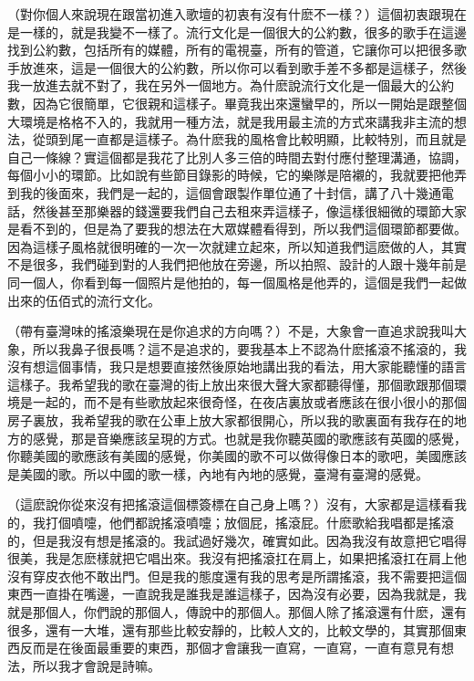 \documentclass[UTF8,a4paper,oneside,twocolumn,12pt]{ctexbook}
\begin{document}
（對你個人來說現在跟當初進入歌壇的初衷有沒有什麽不一樣？）這個初衷跟現在是一樣的，就是我變不一樣了。流行文化是一個很大的公約數，很多的歌手在這邊找到公約數，包括所有的媒體，所有的電視臺，所有的管道，它讓你可以把很多歌手放進來，這是一個很大的公約數，所以你可以看到歌手差不多都是這樣子，然後我一放進去就不對了，我在另外一個地方。為什麽說流行文化是一個最大的公約數，因為它很簡單，它很親和這樣子。畢竟我出來還蠻早的，所以一開始是跟整個大環境是格格不入的，我就用一種方法，就是我用最主流的方式來講我非主流的想法，從頭到尾一直都是這樣子。為什麽我的風格會比較明顯，比較特別，而且就是自己一條線？實這個都是我花了比別人多三倍的時間去對付應付整理溝通，協調，每個小小的環節。比如說有些節目錄影的時候，它的樂隊是陪襯的，我就要把他弄到我的後面來，我們是一起的，這個會跟製作單位通了十封信，講了八十幾通電話，然後甚至那樂器的錢還要我們自己去租來弄這樣子，像這樣很細微的環節大家是看不到的，但是為了要我的想法在大眾媒體看得到，所以我們這個環節都要做。因為這樣子風格就很明確的一次一次就建立起來，所以知道我們這麽做的人，其實不是很多，我們碰到對的人我們把他放在旁邊，所以拍照、設計的人跟十幾年前是同一個人，你看到每一個照片是他拍的，每一個風格是他弄的，這個是我們一起做出來的伍佰式的流行文化。

（帶有臺灣味的搖滾樂現在是你追求的方向嗎？）不是，大象會一直追求說我叫大象，所以我鼻子很長嗎？這不是追求的，要我基本上不認為什麽搖滾不搖滾的，我沒有想這個事情，我只是想要直接然後原始地講出我的看法，用大家能聽懂的語言這樣子。我希望我的歌在臺灣的街上放出來很大聲大家都聽得懂，那個歌跟那個環境是一起的，而不是有些歌放起來很奇怪，在夜店裏放或者應該在很小很小的那個房子裏放，我希望我的歌在公車上放大家都很開心，所以我的歌裏面有我存在的地方的感覺，那是音樂應該呈現的方式。也就是我你聽英國的歌應該有英國的感覺，你聽美國的歌應該有美國的感覺，你美國的歌不可以做得像日本的歌吧，美國應該是美國的歌。所以中國的歌一樣，內地有內地的感覺，臺灣有臺灣的感覺。

（這麽說你從來沒有把搖滾這個標簽標在自己身上嗎？）沒有，大家都是這樣看我的，我打個噴嚏，他們都說搖滾噴嚏；放個屁，搖滾屁。什麽歌給我唱都是搖滾的，但是我沒有想是搖滾的。我試過好幾次，確實如此。因為我沒有故意把它唱得很美，我是怎麽樣就把它唱出來。我沒有把搖滾扛在肩上，如果把搖滾扛在肩上他沒有穿皮衣他不敢出門。但是我的態度還有我的思考是所謂搖滾，我不需要把這個東西一直掛在嘴邊，一直說我是誰我是誰這樣子，因為沒有必要，因為我就是，我就是那個人，你們說的那個人，傳說中的那個人。那個人除了搖滾還有什麽，還有很多，還有一大堆，還有那些比較安靜的，比較人文的，比較文學的，其實那個東西反而是在後面最重要的東西，那個才會讓我一直寫，一直寫，一直有意見有想法，所以我才會說是詩嘛。
\end{document}
